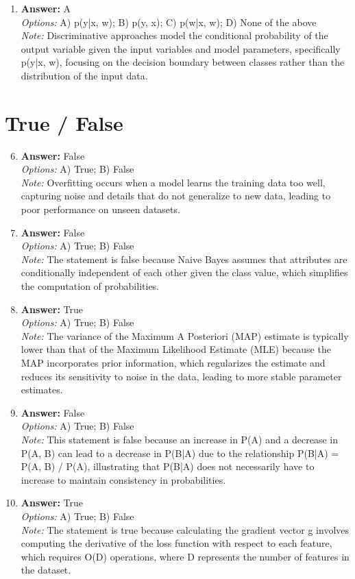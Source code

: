 \documentclass[12pt]{article}
\begin{document}
\begin{enumerate}[label=\arabic*.]
\item \textbf{Answer:} A
\\ \textit{Options:} A) p(y|x, w); B) p(y, x); C) p(w|x, w); D) None of the above
\\ \textit{Note:} Discriminative approaches model the conditional probability of the output variable given the input variables and model parameters, specifically p(y|x, w), focusing on the decision boundary between classes rather than the distribution of the input data.
\end{enumerate}

\section*{True / False}
\begin{enumerate}[label=\arabic*.]
\setcounter{enumi}{5}
\item \textbf{Answer:} False
\\ \textit{Options:} A) True; B) False
\\ \textit{Note:} Overfitting occurs when a model learns the training data too well, capturing noise and details that do not generalize to new data, leading to poor performance on unseen datasets.
\item \textbf{Answer:} False
\\ \textit{Options:} A) True; B) False
\\ \textit{Note:} The statement is false because Naive Bayes assumes that attributes are conditionally independent of each other given the class value, which simplifies the computation of probabilities.
\item \textbf{Answer:} True
\\ \textit{Options:} A) True; B) False
\\ \textit{Note:} The variance of the Maximum A Posteriori (MAP) estimate is typically lower than that of the Maximum Likelihood Estimate (MLE) because the MAP incorporates prior information, which regularizes the estimate and reduces its sensitivity to noise in the data, leading to more stable parameter estimates.
\item \textbf{Answer:} False
\\ \textit{Options:} A) True; B) False
\\ \textit{Note:} This statement is false because an increase in P(A) and a decrease in P(A, B) can lead to a decrease in P(B|A) due to the relationship P(B|A) = P(A, B) / P(A), illustrating that P(B|A) does not necessarily have to increase to maintain consistency in probabilities.
\item \textbf{Answer:} True
\\ \textit{Options:} A) True; B) False
\\ \textit{Note:} The statement is true because calculating the gradient vector g involves computing the derivative of the loss function with respect to each feature, which requires O(D) operations, where D represents the number of features in the dataset.
\end{enumerate}
\end{document}
